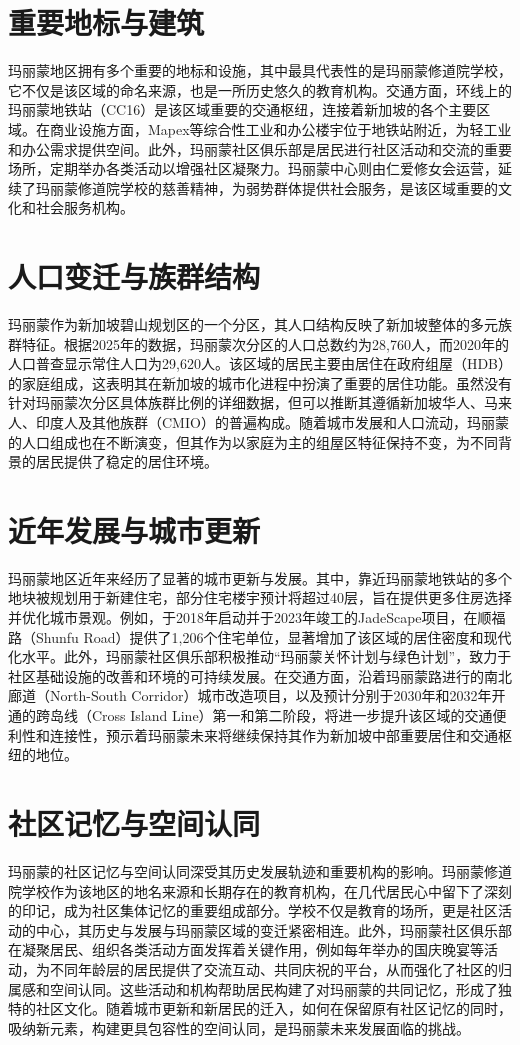 \documentclass[11pt,a4paper,twoside,openany]{book}
\begin{document}
\section{重要地标与建筑}
玛丽蒙地区拥有多个重要的地标和设施，其中最具代表性的是玛丽蒙修道院学校，它不仅是该区域的命名来源，也是一所历史悠久的教育机构。交通方面，环线上的玛丽蒙地铁站（CC16）是该区域重要的交通枢纽，连接着新加坡的各个主要区域。在商业设施方面，Mapex等综合性工业和办公楼宇位于地铁站附近，为轻工业和办公需求提供空间。此外，玛丽蒙社区俱乐部是居民进行社区活动和交流的重要场所，定期举办各类活动以增强社区凝聚力。玛丽蒙中心则由仁爱修女会运营，延续了玛丽蒙修道院学校的慈善精神，为弱势群体提供社会服务，是该区域重要的文化和社会服务机构。

\section{人口变迁与族群结构}
玛丽蒙作为新加坡碧山规划区的一个分区，其人口结构反映了新加坡整体的多元族群特征。根据2025年的数据，玛丽蒙次分区的人口总数约为28,760人，而2020年的人口普查显示常住人口为29,620人。该区域的居民主要由居住在政府组屋（HDB）的家庭组成，这表明其在新加坡的城市化进程中扮演了重要的居住功能。虽然没有针对玛丽蒙次分区具体族群比例的详细数据，但可以推断其遵循新加坡华人、马来人、印度人及其他族群（CMIO）的普遍构成。随着城市发展和人口流动，玛丽蒙的人口组成也在不断演变，但其作为以家庭为主的组屋区特征保持不变，为不同背景的居民提供了稳定的居住环境。

\section{近年发展与城市更新}
玛丽蒙地区近年来经历了显著的城市更新与发展。其中，靠近玛丽蒙地铁站的多个地块被规划用于新建住宅，部分住宅楼宇预计将超过40层，旨在提供更多住房选择并优化城市景观。例如，于2018年启动并于2023年竣工的JadeScape项目，在顺福路（Shunfu Road）提供了1,206个住宅单位，显著增加了该区域的居住密度和现代化水平。此外，玛丽蒙社区俱乐部积极推动“玛丽蒙关怀计划与绿色计划”，致力于社区基础设施的改善和环境的可持续发展。在交通方面，沿着玛丽蒙路进行的南北廊道（North-South Corridor）城市改造项目，以及预计分别于2030年和2032年开通的跨岛线（Cross Island Line）第一和第二阶段，将进一步提升该区域的交通便利性和连接性，预示着玛丽蒙未来将继续保持其作为新加坡中部重要居住和交通枢纽的地位。

\section{社区记忆与空间认同}
玛丽蒙的社区记忆与空间认同深受其历史发展轨迹和重要机构的影响。玛丽蒙修道院学校作为该地区的地名来源和长期存在的教育机构，在几代居民心中留下了深刻的印记，成为社区集体记忆的重要组成部分。学校不仅是教育的场所，更是社区活动的中心，其历史与发展与玛丽蒙区域的变迁紧密相连。此外，玛丽蒙社区俱乐部在凝聚居民、组织各类活动方面发挥着关键作用，例如每年举办的国庆晚宴等活动，为不同年龄层的居民提供了交流互动、共同庆祝的平台，从而强化了社区的归属感和空间认同。这些活动和机构帮助居民构建了对玛丽蒙的共同记忆，形成了独特的社区文化。随着城市更新和新居民的迁入，如何在保留原有社区记忆的同时，吸纳新元素，构建更具包容性的空间认同，是玛丽蒙未来发展面临的挑战。
\end{document}
